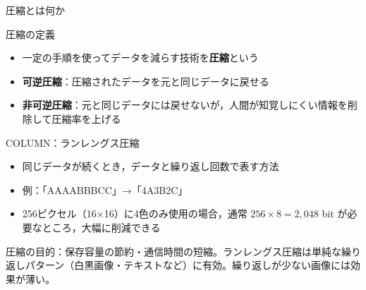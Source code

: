 \documentclass[aspectratio=43,professionalfonts,handout,10pt]{beamer}
\begin{document}

\begin{frame}{圧縮とは何か}
  \begin{block}{圧縮の定義}
    \begin{itemize}
      \item 一定の手順を使ってデータを減らす技術を\textbf{圧縮}という
      \item \textbf{可逆圧縮}：圧縮されたデータを元と同じデータに戻せる
      \item \textbf{非可逆圧縮}：元と同じデータには戻せないが，人間が知覚しにくい情報を削除して圧縮率を上げる
    \end{itemize}
  \end{block}

  \vfill

  \begin{exampleblock}{COLUMN：ランレングス圧縮}
    \begin{itemize}
      \item 同じデータが続くとき，データと繰り返し回数で表す方法
      \item 例：「AAAABBBCC」→「4A3B2C」
      \item 256ピクセル（16×16）に4色のみ使用の場合，通常 $256\times8=2{,}048$ bit が必要なところ，大幅に削減できる
    \end{itemize}
  \end{exampleblock}

  \begin{slidenote}
    \scriptsize 圧縮の目的：保存容量の節約・通信時間の短縮。ランレングス圧縮は単純な繰り返しパターン（白黒画像・テキストなど）に有効。繰り返しが少ない画像には効果が薄い。
  \end{slidenote}
\end{frame}

\end{document}
